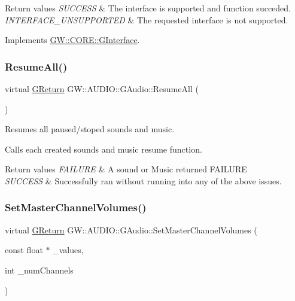 \begin{DoxyRetVals}{Return values}
{\em S\+U\+C\+C\+E\+SS} & The interface is supported and function succeded. \\
\hline
{\em I\+N\+T\+E\+R\+F\+A\+C\+E\+\_\+\+U\+N\+S\+U\+P\+P\+O\+R\+T\+ED} & The requested interface is not supported. \\
\hline
\end{DoxyRetVals}


Implements \mbox{\hyperlink{classGW_1_1CORE_1_1GInterface_ad6c8324970172784964f484686d4fdad}{G\+W\+::\+C\+O\+R\+E\+::\+G\+Interface}}.

\mbox{\label{classGW_1_1AUDIO_1_1GAudio_a230edcaf3c03919d3ba86fdc16b1893f}} 
\subsubsection{\texorpdfstring{ResumeAll()}{ResumeAll()}}
{\footnotesize\ttfamily virtual \mbox{\hyperlink{namespaceGW_a67a839e3df7ea8a5c5686613a7a3de21}{G\+Return}} G\+W\+::\+A\+U\+D\+I\+O\+::\+G\+Audio\+::\+Resume\+All (\begin{DoxyParamCaption}{ }\end{DoxyParamCaption})\hspace{0.3cm}{\ttfamily [pure virtual]}}



Resumes all paused/stoped sounds and music. 

Calls each created sound\textquotesingle{}s and music resume function. 
\begin{DoxyRetVals}{Return values}
{\em F\+A\+I\+L\+U\+RE} & A sound or Music returned F\+A\+I\+L\+U\+RE \\
\hline
{\em S\+U\+C\+C\+E\+SS} & Successfully ran without running into any of the above issues. \\
\hline
\end{DoxyRetVals}
\mbox{\label{classGW_1_1AUDIO_1_1GAudio_a51217fba0337b4e67bf43f77ba69a074}} 
\subsubsection{\texorpdfstring{SetMasterChannelVolumes()}{SetMasterChannelVolumes()}}
{\footnotesize\ttfamily virtual \mbox{\hyperlink{namespaceGW_a67a839e3df7ea8a5c5686613a7a3de21}{G\+Return}} G\+W\+::\+A\+U\+D\+I\+O\+::\+G\+Audio\+::\+Set\+Master\+Channel\+Volumes (\begin{DoxyParamCaption}\item[{const float $\ast$}]{\+\_\+values,  }\item[{int}]{\+\_\+num\+Channels }\end{DoxyParamCaption})\hspace{0.3cm}{\ttfamily [pure virtual]}}



